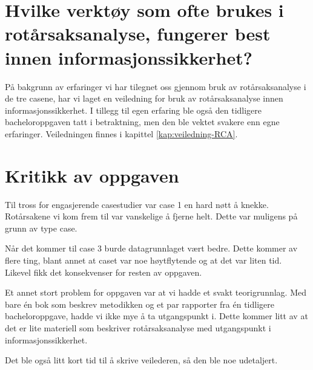 \section{Hvilke verktøy som ofte brukes i rotårsaksanalyse, fungerer best innen informasjonssikkerhet?}
På bakgrunn av erfaringer vi har tilegnet oss gjennom bruk av rotårsaksanalyse i de tre casene, har vi laget en veiledning for bruk av rotårsaksanalyse innen informasjonssikkerhet. I tillegg til egen erfaring ble også den tidligere bacheloroppgaven \cite{RCARapport} tatt i betraktning, men den ble vektet svakere enn egne erfaringer. Veiledningen finnes i kapittel \ref{kap:veiledning-RCA}. 


\section{Kritikk av oppgaven}
Til tross for engasjerende casestudier var case 1 en hard nøtt å knekke. Rotårsakene vi kom frem til var vanskelige å fjerne helt. Dette var muligens på grunn av type case. 

Når det kommer til case 3 burde datagrunnlaget vært bedre. Dette kommer av flere ting, blant annet at caset var noe høytflytende og at det var liten tid. Likevel fikk det konsekvenser for resten av oppgaven. 

Et annet stort problem for oppgaven var at vi hadde et svakt teorigrunnlag. Med bare én bok som beskrev metodikken og et par rapporter fra én tidligere bacheloroppgave, hadde vi ikke mye å ta utgangspunkt i. Dette kommer litt av at det er lite materiell som beskriver rotårsaksanalyse med utgangspunkt i informasjonssikkerhet. 

Det ble også litt kort tid til å skrive veilederen, så den ble noe udetaljert. 